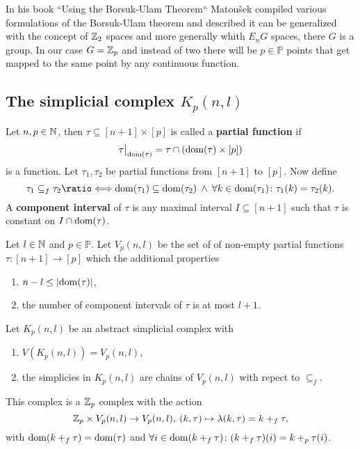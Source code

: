 In his book ``Using the Borsuk-Ulam Theorem`` \cite{using2003} Matoušek compiled various formulations of the Borsuk-Ulam theorem and described it can be generalized with the concept of $\mathbb{Z}_2$ spaces and more generally whith $E_nG$ spaces, there $G$ is a group. In our case $G = \mathbb{Z}_p$ and instead of two there will be $p \in \mathbb{P}$ points that get mapped to the same point by any continuous function. 

\subsection{The simplicial complex $K_p(n, l)$}

\begin{defin}
  Let $n, p \in \mathbb{N}$, then $\tau \subseteq [n+1] \times [p]$ is called a \textbf{partial function} if \[\restr{\tau}{\dom(\tau)} = \tau \cap (\dom(\tau) \times [p])\] is a function. Let $\tau_1, \tau_2$ be partial functions from $[n+1]$ to $[p]$. Now define
  \begin{equation*}
    \tau_1 \subseteq_f \tau_2 \longeq \dom(\tau_1) \subseteq \dom(\tau_2) \: \land \: \forall k \in \dom(\tau_1)\colon \tau_1(k) = \tau_2(k).
  \end{equation*}
  A \textbf{component interval} of $\tau$ is any maximal interval $I \subseteq [n+1]$ such that $\tau$ is constant on $I \cap {\rm dom}(\tau)$.
\end{defin}

\begin{defin}
  Let $l \in \mathbb{N}$ and $p \in \mathbb{P}$. Let $V_p(n, l)$ be the set of of non-empty partial functions $\tau\colon [n+1] \to [p]$ which the additional properties
  \begin{enumerate}[label=\roman*.)]
    \item $n - l \leq |{\rm dom}(\tau)|$,
    \item the number of component intervals of $\tau$ is at most $l+1$.
  \end{enumerate}
\end{defin}

\begin{defin}
  Let $K_p(n,l)$ be an abstract simplicial complex with
  \begin{enumerate}[label=\roman*.)]
    \item $V(K_p(n,l)) = V_p(n,l)$,
    \item the simplicies in $K_p(n,l)$ are chains of $V_p(n,l)$ with repect to $\subseteq_f$.
  \end{enumerate}
  This complex is a $\mathbb{Z}_p$ complex with the action
  \begin{equation*}
    \mathbb{Z}_p \times V_p(n,l) \to V_p(n,l), \: (k, \tau) \mapsto \lambda(k, \tau) = k +_f \tau,
  \end{equation*}
  with ${\rm dom}(k +_f \tau) = {\rm dom}(\tau)$ and $\forall i\in {\rm dom}(k +_f \tau)\colon (k+_f\tau)(i) = k +_p \tau(i)$.
\end{defin}

